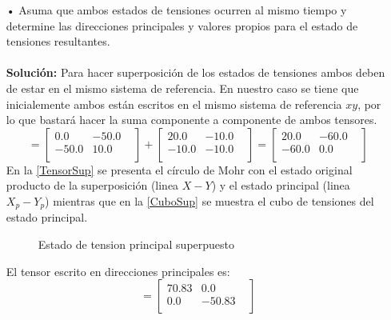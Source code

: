 \documentclass[../notas medios.tex]{subfiles}
\begin{document}
\begin{enumerate}
%
\item[•] Asuma que ambos estados de tensiones ocurren al mismo tiempo y determine
las direcciones principales y valores propios para el estado de tensiones
resultantes. \\\\
%
\textbf{Solución:}
%
Para hacer superposición de los estados de tensiones ambos deben de estar en el
mismo sistema de referencia. En nuestro caso se tiene que inicialemente ambos
están escritos en el mismo sistema de referencia $x y$, por lo que bastará hacer
la suma componente a componente de ambos tensores.
\begin{equation}
[\sigma_t] =
 	\begin{bmatrix}
     	0.0 & -50.0 &  \\
     	-50.0 & 10.0 \\
 	\end{bmatrix}
	+
 	\begin{bmatrix}
     	20.0 & -10.0 &  \\
     	-10.0 & -10.0 \\
 	\end{bmatrix}
 	=
 	\begin{bmatrix}
     	20.0 & -60.0 &  \\
     	-60.0 & 0.0 \\
 	\end{bmatrix}
\end{equation}
%
En la  \cref{TensorSup} se presenta el círculo de Mohr
con el estado original producto de la superposición (linea $X -Y$) y el estado
principal (linea $X_p - Y_p$) mientras que en la \cref{CuboSup} se muestra
el cubo de tensiones del estado principal.
%
\begin{figure}[H]
	\centering
		\hspace{0.5cm}
	\caption{Estado de tension principal superpuesto }
	\label{TensSupPrin}
\end{figure}
%
El tensor escrito en direcciones principales es: 
\begin{equation}
 [\sigma^p_{2}] =
 	\begin{bmatrix}
     	70.83 & 0.0 &  \\
     	0.0 & -50.83 \\
 	\end{bmatrix}
\end{equation}

\end{enumerate}
\end{document}
